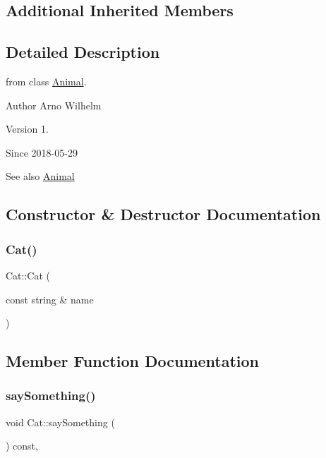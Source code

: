 \subsection*{Additional Inherited Members}


\subsection{Detailed Description}
from class \hyperlink{classAnimal}{Animal}.

\begin{DoxyAuthor}{Author}
Arno Wilhelm 
\end{DoxyAuthor}
\begin{DoxyVersion}{Version}
1. 
\end{DoxyVersion}
\begin{DoxySince}{Since}
2018-\/05-\/29 
\end{DoxySince}
\begin{DoxySeeAlso}{See also}
\hyperlink{classAnimal}{Animal} 
\end{DoxySeeAlso}


\subsection{Constructor \& Destructor Documentation}
\mbox{\label{classCat_ae76478a80ba65c308a4efb251c3dc844}} 
\subsubsection{\texorpdfstring{Cat()}{Cat()}}
{\footnotesize\ttfamily Cat\+::\+Cat (\begin{DoxyParamCaption}\item[{const string \&}]{name }\end{DoxyParamCaption})\hspace{0.3cm}{\ttfamily [inline]}}



\subsection{Member Function Documentation}
\mbox{\label{classCat_a2da2143abb847a8719e302614ccb8d2e}} 
\subsubsection{\texorpdfstring{say\+Something()}{saySomething()}}
{\footnotesize\ttfamily void Cat\+::say\+Something (\begin{DoxyParamCaption}{ }\end{DoxyParamCaption}) const\hspace{0.3cm}{\ttfamily [inline]}, {\ttfamily [virtual]}}

